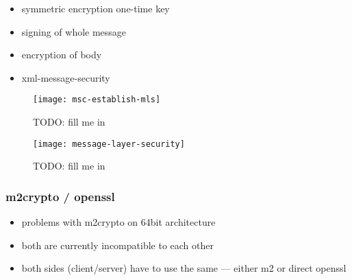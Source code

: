 \begin{itemize}
\item symmetric encryption one-time key
\item signing of whole message
\item encryption of body
\item xml-message-security
\end{itemize}

\begin{figure}[ht]
  \centering
  \texttt{[image: msc-establish-mls]}
  \caption[MSC Message Layer Security]{TODO: fill me in}
  \label{fig:msc-establish-mls}
\end{figure}


\begin{figure}[ht]
  \centering
  \texttt{[image: message-layer-security]}
  \caption[Message Layer Security]{TODO: fill me in}
  \label{fig:net-mls}
\end{figure}

\subsubsection{m2crypto / openssl}

\begin{itemize}
\item problems with m2crypto on 64bit architecture
\item both are currently incompatible to each other
\item both sides (client/server) have to use the same --- either m2 or
  direct openssl
\end{itemize}

